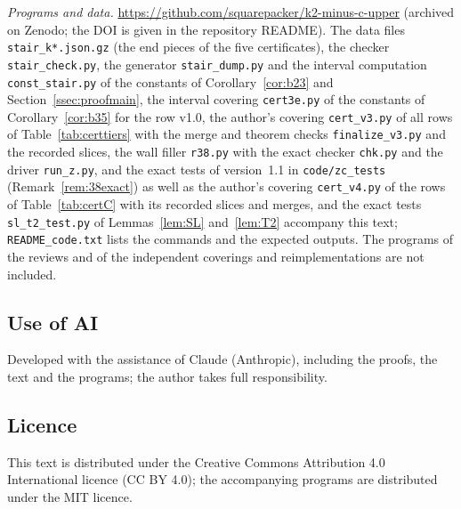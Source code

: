 \documentclass[11pt]{amsart}
\theoremstyle{definition}
\theoremstyle{remark}
\numberwithin{equation}{section}
\begin{document}
\emph{Programs and data.} \url{https://github.com/squarepacker/k2-minus-c-upper} (archived on Zenodo; the DOI is
given in the repository README). The data files \texttt{stair\_k*.json.gz} (the end pieces of the five certificates),
the checker \texttt{stair\_check.py}, the generator \texttt{stair\_dump.py} and the interval computation
\texttt{const\_stair.py} of the constants of Corollary~\ref{cor:b23} and Section~\ref{ssec:proofmain}, the interval
covering \texttt{cert3e.py} of the constants of Corollary~\ref{cor:b35} for the row v1.0, the author's covering
\texttt{cert\_v3.py} of all rows of Table~\ref{tab:certtiers} with the merge and theorem checks \texttt{finalize\_v3.py}
and the recorded slices, the wall filler \texttt{r38.py} with the exact checker \texttt{chk.py} and the driver
\texttt{run\_z.py}, and the exact tests of version~1.1 in \texttt{code/zc\_tests} (Remark~\ref{rem:38exact})
as well as the author's covering \texttt{cert\_v4.py} of the rows of Table~\ref{tab:certC} with its recorded slices and merges, and
the exact tests \texttt{sl\_t2\_test.py} of Lemmas~\ref{lem:SL} and~\ref{lem:T2}
accompany this text; \texttt{README\_code.txt} lists the commands and the expected outputs. The programs of the reviews and of
the independent coverings and reimplementations are not included.

\subsection*{Use of AI}
Developed with the assistance of Claude (Anthropic), including the proofs, the text and the programs; the author takes
full responsibility.

\subsection*{Licence}
This text is distributed under the Creative Commons Attribution 4.0 International licence (CC BY 4.0); the accompanying
programs are distributed under the MIT licence.
\end{document}
